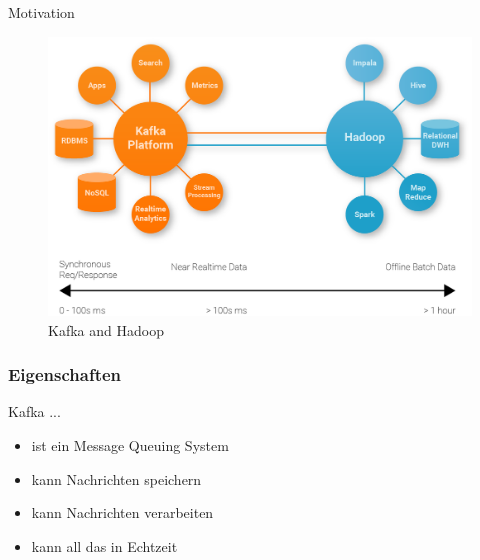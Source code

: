 \begin{frame}{Motivation}
\begin{figure}
	\centering
	\includegraphics[scale=0.165]{figure/kafka_vs_hadoop.png}
	\caption{Kafka and Hadoop~\cite{Rao17}}
\end{figure}
\end{frame}

\begin{frame}
\frametitle{Eigenschaften}
Kafka ...
\begin{itemize}
	\item ist ein Message Queuing System
	\item kann Nachrichten speichern
	\item kann Nachrichten verarbeiten
	\item kann all das in Echtzeit
\end{itemize}

\end{frame}

